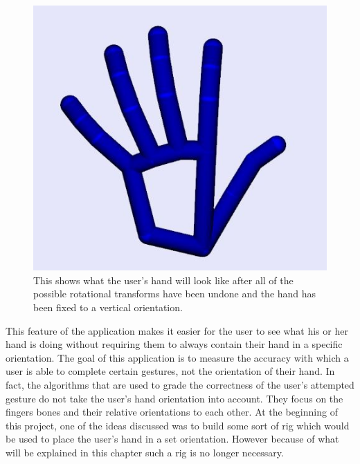 \begin{figure}[H]
\centering
\includegraphics[scale=0.45]{Figures/4_handFinalFix.JPG}
\caption[Hand Fixed to Vertical Orientation]{This shows what the user's hand will look like after all of the possible rotational transforms have been undone and the hand has been fixed to a vertical orientation.}
\label{fig:weirdHandShake}
\end{figure}
This feature of the application makes it easier for the user to see what his or her hand is doing without requiring them to always contain their hand in a specific orientation. The goal of this application is to measure the accuracy with which a user is able to complete certain gestures, not the orientation of their hand. In fact, the algorithms that are used to grade the correctness of the user's attempted gesture do not take the user's hand orientation into account. They focus on the fingers bones and their relative orientations to each other. At the beginning of this project, one of the ideas discussed was to build some sort of rig which would be used to place the user's hand in a set orientation. However because of what will be explained in this chapter such a rig is no longer necessary.



